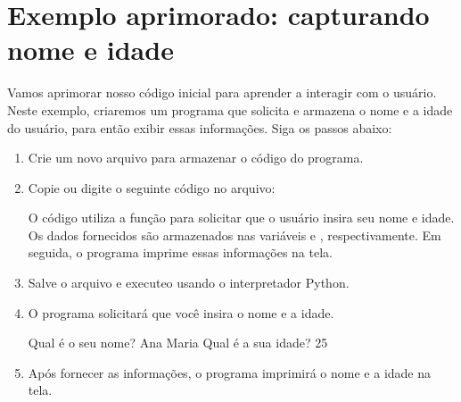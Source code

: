 \documentclass[letterpaper,10pt,english]{jupyterBook}
\begin{document}
\section{Exemplo aprimorado: capturando nome e idade}
\label{\detokenize{chapters/ch1/ch1:exemplo-aprimorado-capturando-nome-e-idade}}
\sphinxAtStartPar
Vamos aprimorar nosso código inicial para aprender a interagir com o usuário. Neste exemplo, criaremos um programa que solicita e armazena o nome e a idade do usuário, para então exibir essas informações. Siga os passos abaixo:
\begin{enumerate}
%
\item {} 
\sphinxAtStartPar
Crie um novo arquivo para armazenar o código do programa.

\item {} 
\sphinxAtStartPar
Copie ou digite o seguinte código no arquivo:

\begin{sphinxVerbatim}[commandchars=\\\{\}]
  
  
\end{sphinxVerbatim}

\sphinxAtStartPar
O código utiliza a função  para solicitar que o usuário insira seu nome e idade. Os dados fornecidos são armazenados nas variáveis  e , respectivamente. Em seguida, o programa imprime essas informações na tela.

\item {} 
\sphinxAtStartPar
Salve o arquivo e execute\sphinxhyphen{}o usando o interpretador Python.

\item {} 
\sphinxAtStartPar
O programa solicitará que você insira o nome e a idade.

\begin{sphinxVerbatim}[commandchars=\\\{\}]
Qual é o seu nome? Ana Maria
Qual é a sua idade? 25
\end{sphinxVerbatim}

\item {} 
\sphinxAtStartPar
Após fornecer as informações, o programa imprimirá o nome e a idade na tela.

\begin{sphinxVerbatim}[commandchars=\\\{\}]
 
\end{sphinxVerbatim}

\end{enumerate}
\end{document}
